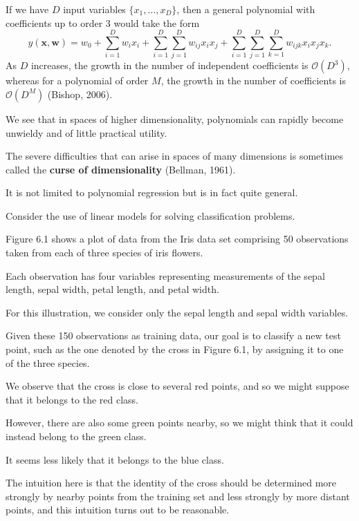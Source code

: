 \documentclass{article}
\begin{document}
If we have $D$ input variables $\{x_1, \ldots, x_D\}$, then a general polynomial with coefficients up to order 3 would take the form
\begin{equation}
y(\mathbf{x}, \mathbf{w}) = w_0 + \sum_{i=1}^{D} w_i x_i + \sum_{i=1}^{D} \sum_{j=1}^{D} w_{ij} x_i x_j + \sum_{i=1}^{D} \sum_{j=1}^{D} \sum_{k=1}^{D} w_{ijk} x_i x_j x_k.
\end{equation}
As $D$ increases, the growth in the number of independent coefficients is $\mathcal{O}(D^3)$, whereas for a polynomial of order $M$, the growth in the number of coefficients is $\mathcal{O}(D^M)$ (Bishop, 2006). 

We see that in spaces of higher dimensionality, polynomials can rapidly become unwieldy and of little practical utility.

The severe difficulties that can arise in spaces of many dimensions is sometimes called the \textbf{curse of dimensionality} (Bellman, 1961). 

It is not limited to polynomial regression but is in fact quite general. 

Consider the use of linear models for solving classification problems. 

Figure 6.1 shows a plot of data from the Iris data set comprising 50 observations taken from each of three species of iris flowers. 

Each observation has four variables representing measurements of the sepal length, sepal width, petal length, and petal width. 

For this illustration, we consider only the sepal length and sepal width variables. 

Given these 150 observations as training data, our goal is to classify a new test point, such as the one denoted by the cross in Figure 6.1, by assigning it to one of the three species. 

We observe that the cross is close to several red points, and so we might suppose that it belongs to the red class. 

However, there are also some green points nearby, so we might think that it could instead belong to the green class. 

It seems less likely that it belongs to the blue class. 

The intuition here is that the identity of the cross should be determined more strongly by nearby points from the training set and less strongly by more distant points, and this intuition turns out to be reasonable.
\end{document}
